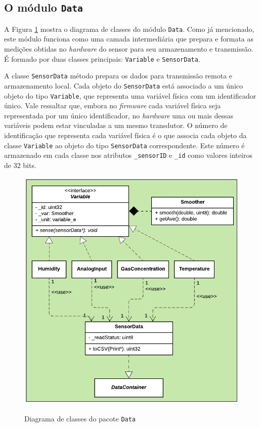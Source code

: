 \subsection{O módulo \texttt{Data}}

A Figura \ref{fig:fw-libraries-data} mostra o diagrama de classes do módulo \texttt{Data}. Como já mencionado, este módulo funciona como uma camada intermediária que prepara e formata as medições obtidas no \textit{hardware} do sensor para seu armazenamento e transmissão. É formado por duas classes principais: \texttt{Variable} e \texttt{SensorData}.

A classe \texttt{SensorData} método prepara os dados para transmissão remota e armazenamento local. Cada objeto do \texttt{SensorData} está associado a um único objeto do tipo \texttt{Variable}, que representa uma variável física com um identificador único. Vale ressaltar que, embora no \textit{firmware} cada variável física seja representada por um único identificador, no \textit{hardware} uma ou mais dessas variáveis podem estar vinculadas a um mesmo transdutor. O número de identificação que representa cada variável física é o que associa cada objeto da classe \texttt{Variable} ao objeto do tipo \texttt{SensorData} correspondente. Este número é armazenado em cada classe nos atributos \texttt{\_sensorID} e \texttt{\_id} como valores inteiros de 32 bits.

\begin{figure}[h]
    \centering
    \caption{Diagrama de classes do pacote \texttt{Data}}
    \includegraphics[width=0.80\linewidth]{chapters//2-CLEAN/Figuras/Diagrama-de-classes-Data-Package.png}
    \label{fig:fw-libraries-data}
\end{figure}

